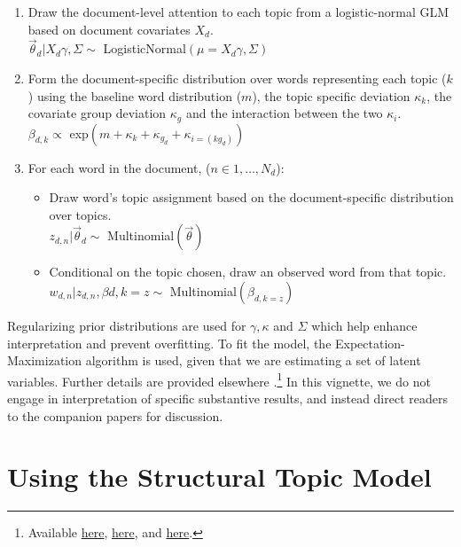 \documentclass[nojss]{jss}
\begin{document}
\begin{enumerate}
\item Draw the document-level attention to each topic from a logistic-normal GLM based on document covariates $X_d$. \\
$\vec{\theta}_d | X_d\gamma, \Sigma \sim$ LogisticNormal$(\mu = X_d\gamma, \Sigma)$
\item Form the document-specific distribution over words representing each topic ($k$) using the baseline word distribution ($m$), the topic specific deviation $\kappa_k$, the covariate group deviation $\kappa_g$ and the interaction between the two $\kappa_i$.\\
$\beta_{d,k} \propto $ exp$(m + \kappa_{k} + \kappa_{g_d} + \kappa_{i=(kg_d)})$
\item For each word in the document, ($n \in 1, \dots, N_d$):
\begin{itemize}
\item Draw word's topic assignment based on the document-specific distribution over topics.\\
 $z_{d,n} | \vec{\theta}_d \sim $ Multinomial$(\vec{\theta})$
\item Conditional on the topic chosen, draw an observed word from that topic.\\
$ w_{d,n} | z_{d,n}, \beta{d,k=z} \sim $ Multinomial$(\beta_{d,k=z})$
\end{itemize}
\end{enumerate}

Regularizing prior distributions are used for $\gamma, \kappa$ and $\Sigma$ which help enhance interpretation and prevent overfitting. To fit the model, the Expectation-Maximization algorithm is used, given that we are estimating a set of latent variables. Further details are provided elsewhere \citep{nips2013,STMEdo,ajps,TextComparative}.\footnote{Available \href{http://scholar.harvard.edu/files/dtingley/files/topicmodelsopenendedexperiments.pdf}{here}, \href{http://scholar.harvard.edu/files/bstewart/files/stmnips2013.pdf}{here}, and \href{http://scholar.harvard.edu/files/dtingley/files/comparativepoliticstext.pdf}{here}.} In this vignette, we do not engage in interpretation of specific substantive results, and instead direct readers to the companion papers for discussion.


\section{Using the Structural Topic Model}
\end{document}
